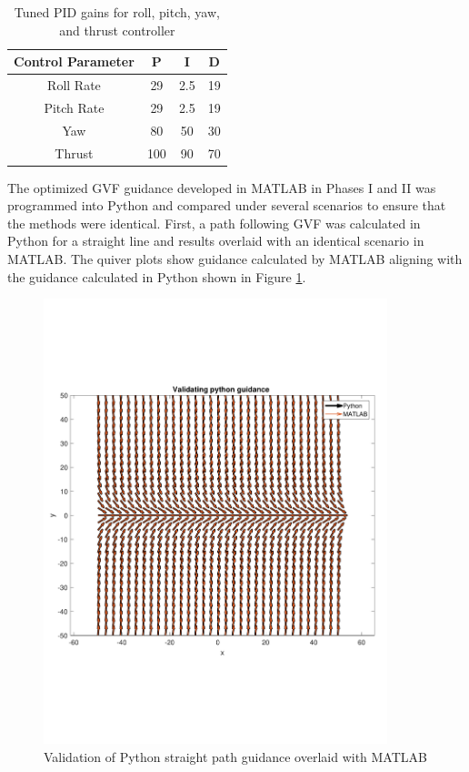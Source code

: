 \documentclass[numbered,pdftex]{ohio-etd}
\begin{document}
\begin{table}[H]
	\centering
	\caption{Tuned PID gains for roll, pitch, yaw, and thrust controller}
	\label{table:pidGains}
	\begin{tabular}{|c|c|c|c|}
		\hline 
		Control Parameter & P & I & D \\ 
		\hline 
		Roll Rate & 29 & 2.5 & 19 \\ 
		\hline 
		Pitch Rate & 29 & 2.5 & 19 \\ 
		\hline 
		Yaw & 80 & 50 & 30 \\ 
		\hline 
		Thrust & 100 & 90 & 70 \\ 
		\hline 
	\end{tabular}
\end{table}
 

The optimized GVF guidance developed in MATLAB in Phases I and II was programmed into Python and compared under several scenarios to ensure that the methods were identical. First, a path following GVF was calculated in Python for a straight line and results overlaid with an identical scenario in MATLAB. The quiver plots show guidance calculated by MATLAB aligning with the guidance calculated in Python shown in Figure \ref{fig:valPythonStraightPath}.



\begin{figure}[H]
	\centering
	\includegraphics[trim=0 150 0 150,clip,width=10cm]{PaperFigures/Methods/resultsPython/PathConfirm}
	\caption{Validation of Python straight path guidance overlaid with MATLAB}
	\label{fig:valPythonStraightPath}
\end{figure}
\end{document}
